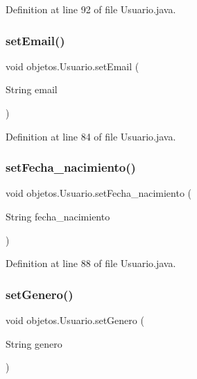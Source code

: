 Definition at line 92 of file Usuario.\+java.

\mbox{\label{classobjetos_1_1_usuario_ad64ef1b4bc35e4039e9e5f31d651e043}} 
\subsubsection{\texorpdfstring{set\+Email()}{setEmail()}}
{\footnotesize\ttfamily void objetos.\+Usuario.\+set\+Email (\begin{DoxyParamCaption}\item[{String}]{email }\end{DoxyParamCaption})}



Definition at line 84 of file Usuario.\+java.

\mbox{\label{classobjetos_1_1_usuario_a5d99fa41f8ec817e0eca78ef718a3771}} 
\subsubsection{\texorpdfstring{set\+Fecha\+\_\+nacimiento()}{setFecha\_nacimiento()}}
{\footnotesize\ttfamily void objetos.\+Usuario.\+set\+Fecha\+\_\+nacimiento (\begin{DoxyParamCaption}\item[{String}]{fecha\+\_\+nacimiento }\end{DoxyParamCaption})}



Definition at line 88 of file Usuario.\+java.

\mbox{\label{classobjetos_1_1_usuario_ac9905e666ce288e519fc087e23d25854}} 
\subsubsection{\texorpdfstring{set\+Genero()}{setGenero()}}
{\footnotesize\ttfamily void objetos.\+Usuario.\+set\+Genero (\begin{DoxyParamCaption}\item[{String}]{genero }\end{DoxyParamCaption})}



